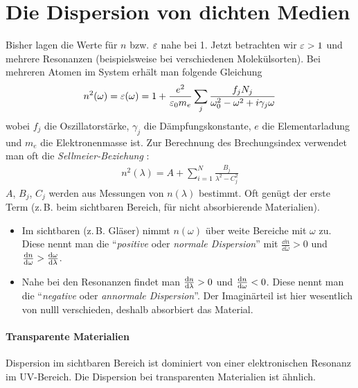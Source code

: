 \section{Die Dispersion von dichten Medien}
Bisher lagen die Werte für  $n$ bzw. $\eps$ nahe bei 1. Jetzt
betrachten wir $\eps>1$ und mehrere Resonanzen (beispielsweise bei
verschiedenen Molekülsorten). Bei mehreren Atomen im System erhält man
folgende Gleichung
\begin{gather}
  n^2(\omega)
  = \eps(\omega)
  = 1 + \frac{e^2}{\epso m_e}\sum_{j}
  \frac{f_jN_j}{\omegao^2-\omega^2+i\gamma_j\omega}
  \label{brechungsindexallg}
\end{gather} 
wobei $f_j$
die Oszillatorstärke,
$\gamma_j$ die
Dämpfungskonstante,
$e$ die Elementarladung und
$m_e$ die Elektronenmasse ist.
Zur Berechnung des Brechungsindex verwendet man oft die 
\emph{Sellmeier-Beziehung}%
:
\begin{align*}
	n^2(\lambda)= A + \sum_{i=1}^{N}\frac{B_j}{\lambda^2-C_j^2}
\end{align*}
$A$, $B_j$, $C_j$ werden aus Messungen von $n(\lambda)$ bestimmt. Oft
genügt der erste Term (z.\,B. beim sichtbaren Bereich, für nicht
absorbierende Materialien).
\begin{itemize}
	\item Im sichtbaren (z.\,B. Gläser) nimmt $n(\omega)$ über weite
      Bereiche mit $\omega$ zu. Diese nennt man die 
      \enquote{\emph{positive} oder \emph{normale Dispersion}}%
      mit $\frac{\dd n}{\dd \omega}>0$
      und $\frac{\dd n}{\dd \omega}>\ddif[\omega]{\lambda}$.
	\item Nahe bei den Resonanzen findet man $\ddif[n]{\lambda}>0$ und
      $\ddif[n]{\omega}<0$. Diese nennt man die 
      \enquote{\emph{negative} oder \emph{annormale Dispersion}}. 
      Der Imaginärteil ist hier wesentlich
      von nulll verschieden, deshalb absorbiert das Material. 
\end{itemize}

\paragraph{Transparente Materialien} Dispersion im sichtbaren Bereich
ist dominiert  von einer elektronischen Resonanz im UV-Bereich. Die
Dispersion bei transparenten Materialien ist ähnlich.


